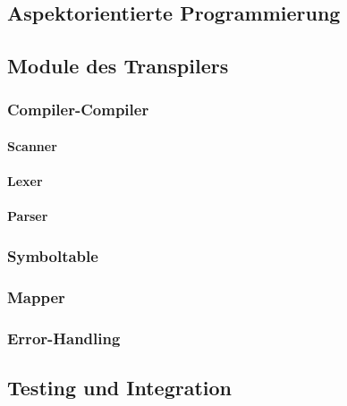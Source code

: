 

\subsection{Aspektorientierte Programmierung}
 
\subsection{Module des Transpilers}
\subsubsection{Compiler-Compiler}
\paragraph{Scanner}
\paragraph{Lexer}
\paragraph{Parser}
\subsubsection{Symboltable}

\subsubsection{Mapper}

\subsubsection{Error-Handling}

\subsection{Testing und Integration}

